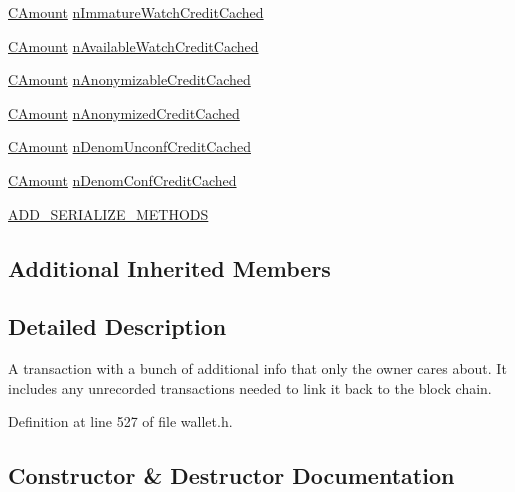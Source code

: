 \begin{DoxyCompactItemize}
\hyperlink{amount_8h_a4eaf3a5239714d8c45b851527f7cb564}{C\+Amount} \hyperlink{class_c_wallet_tx_afe7b93d5672df90c6b1d3065dc047fe0}{n\+Immature\+Watch\+Credit\+Cached}
\item 
\hyperlink{amount_8h_a4eaf3a5239714d8c45b851527f7cb564}{C\+Amount} \hyperlink{class_c_wallet_tx_ab3113c0543c6f68ccbb2449dde29aec7}{n\+Available\+Watch\+Credit\+Cached}
\item 
\hyperlink{amount_8h_a4eaf3a5239714d8c45b851527f7cb564}{C\+Amount} \hyperlink{class_c_wallet_tx_ad68a73e3dde08f0f397147f825a09263}{n\+Anonymizable\+Credit\+Cached}
\item 
\hyperlink{amount_8h_a4eaf3a5239714d8c45b851527f7cb564}{C\+Amount} \hyperlink{class_c_wallet_tx_af181c96d03d064524fec21c2f8d6f1c1}{n\+Anonymized\+Credit\+Cached}
\item 
\hyperlink{amount_8h_a4eaf3a5239714d8c45b851527f7cb564}{C\+Amount} \hyperlink{class_c_wallet_tx_a1ecccbf8322abc397686907c0cbcefba}{n\+Denom\+Unconf\+Credit\+Cached}
\item 
\hyperlink{amount_8h_a4eaf3a5239714d8c45b851527f7cb564}{C\+Amount} \hyperlink{class_c_wallet_tx_a2fcf31679a29b43c3a01dd44bf844aee}{n\+Denom\+Conf\+Credit\+Cached}
\item 
\hyperlink{class_c_wallet_tx_aad8df774858ddd54f06a76eb075f2823}{A\+D\+D\+\_\+\+S\+E\+R\+I\+A\+L\+I\+Z\+E\+\_\+\+M\+E\+T\+H\+O\+D\+S}
\end{DoxyCompactItemize}
\subsection*{Additional Inherited Members}


\subsection{Detailed Description}
A transaction with a bunch of additional info that only the owner cares about. It includes any unrecorded transactions needed to link it back to the block chain. 

Definition at line 527 of file wallet.\+h.



\subsection{Constructor \& Destructor Documentation}
\hypertarget{class_c_wallet_tx_a2124bd17388493a5d883a7ab2cc825b0}{}
